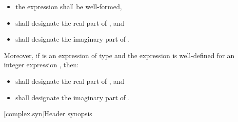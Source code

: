 \begin{itemize}
\item the expression  shall be well-formed,
\item {} shall designate the real part of , and
\item {} shall designate the imaginary part of .
\end{itemize}

Moreover, if  is an expression of type  and the expression  is well-defined for an integer expression , then:

\begin{itemize}
\item {} shall designate the real part of , and
\item {} shall designate the imaginary part of .
\end{itemize}

[complex.syn]{Header  synopsis}

